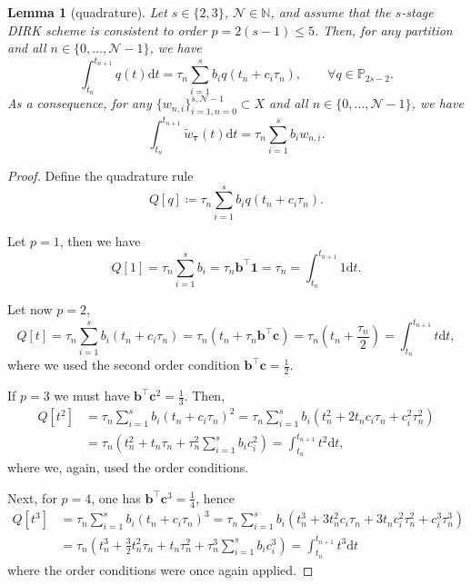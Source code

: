 \documentclass{amsart}
\newcommand{\bftau}{{\boldsymbol{\tau}}}
\newcommand{\Natural}{\mathbb{N}}
\newcommand{\mclN}{\mathcal{N}}
\newcommand{\bfone }{\mathbf{1}}
\newcommand{\bfb}{\boldsymbol{b}}
\newcommand{\bfc}{\boldsymbol{c}}
\newcommand{\mbbP}{\mathbb{P}}
\newtheorem{lemma}{Lemma}[section]
\theoremstyle{definition}
\newcommand{\diff}{\mathrm{d}}
\begin{document}
\begin{lemma}[quadrature]
\label{lem:quadrature}
  Let $s \in \{2, 3\}$, $\mclN \in \Natural$, and assume that the $s$-stage DIRK scheme is consistent to order $p=2(s-1) \leq 5$. Then, for any partition and all $n \in \{0, \ldots, \mclN-1\}$, we have
  \[
    \int_{t_n}^{t_{n+1}} q(t) \diff t = \tau_n \sum_{i=1}^s b_i q(t_n + c_i \tau_n), \qquad \forall q \in \mbbP_{2s-2}.
  \]
  As a consequence, for any $\{w_{n,i} \}_{i=1,n=0}^{s,\mclN-1} \subset X$ and all $n \in \{0, \ldots, \mclN-1\}$, we have
  \begin{equation}
  \label{eq:Integration}
    \int_{t_n}^{t_{n+1}} \tilde{w}_\bftau(t) \diff t = \tau_n \sum_{i=1}^s b_i w_{n,i}.
  \end{equation}
\end{lemma}
\begin{proof}
  Define the quadrature rule
  \[
    Q[q] \coloneqq \tau_n \sum_{i=1}^s b_i q(t_n + c_i \tau_n).
  \]
  
  Let $p=1$, then we have
  \[
    Q[1] = \tau_n \sum_{i=1}^s b_i = \tau_n \bfb^\top \bfone = \tau_n = \int_{t_n}^{t_{n+1}} 1 \diff t.
  \]
  
  Let now $p=2$,
  \[
    Q[t] = \tau_n \sum_{i=1}^s b_i (t_n + c_i \tau_n) = \tau_n \left( t_n + \tau_n \bfb^\top \bfc \right) = \tau_n \left( t_n + \frac{\tau_n}2 \right) = \int_{t_n}^{t_{n+1}} t \diff t,
  \]
  where we used the second order condition $\bfb^\top \bfc = \tfrac12$.
  
  If $p = 3$ we must have $\bfb^\top \bfc^2 =\tfrac13 $. Then,
  \begin{align*}
    Q[t^2] &= \tau_n \sum_{i=1}^s b_i (t_n + c_i \tau_n)^2 = \tau_n \sum_{i=1}^s b_i \left( t_n^2 + 2t_n c_i \tau_n + c_i^2 \tau_n^2  \right) 
    \\
    &= \tau_n \left( t_n^2  + t_n \tau_n + \tau_n^2 \sum_{i=1}^s b_i c_i^2 \right) = \int_{t_n}^{t_{n+1}} t^2 \diff t,
  \end{align*}
  where we, again, used the order conditions.

  Next, for $p =4$, one has $\bfb^\top \bfc^3 = \frac{1}{4}$, hence
   \begin{align*}
    Q[t^3] & = \tau_n \sum_{i=1}^s b_i (t_n + c_i \tau_n)^3 = \tau_n \sum_{i=1}^s b_i \left( t_n^3 + 3 t_n^2 c_i \tau_n + 3 t_n c_i^2 \tau_n^2 + c_i^3 \tau_n^3\right) \\
    & = \tau_n \left(t_n^3 + \frac{3}{2}t_n^2 \tau_n +t_n \tau_n^2 +\tau_n^3 \sum_{i=1}^s b_i c_i^3 \right) = \int_{t_n}^{t_{n+1}} t^3 \diff t
  \end{align*}
  where the order conditions were once again applied.
  

\end{proof}
\end{document}

